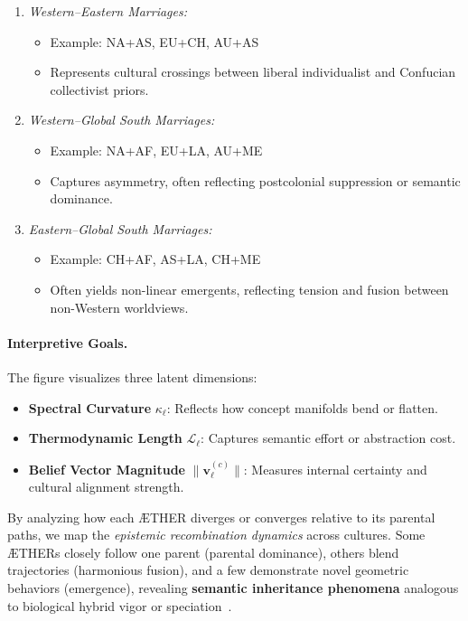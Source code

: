 \begin{enumerate}[leftmargin=1.5em]
    \item \emph{Western--Eastern Marriages:} 
    \begin{itemize}
        \item Example: NA+AS, EU+CH, AU+AS
        \item Represents cultural crossings between liberal individualist and Confucian collectivist priors.
    \end{itemize}
    
    \item \emph{Western--Global South Marriages:}
    \begin{itemize}
        \item Example: NA+AF, EU+LA, AU+ME
        \item Captures asymmetry, often reflecting postcolonial suppression or semantic dominance.
    \end{itemize}
    
    \item \emph{Eastern--Global South Marriages:}
    \begin{itemize}
        \item Example: CH+AF, AS+LA, CH+ME
        \item Often yields non-linear emergents, reflecting tension and fusion between non-Western worldviews.
    \end{itemize}
\end{enumerate}

\paragraph{\textbf{Interpretive Goals.}} The figure visualizes three latent dimensions:
\begin{itemize}[leftmargin=1.5em]
    \item \textbf{Spectral Curvature} \( \kappa_\ell \): Reflects how concept manifolds bend or flatten.
    \item \textbf{Thermodynamic Length} \( \mathcal{L}_\ell \): Captures semantic effort or abstraction cost.
    \item \textbf{Belief Vector Magnitude} \( \| \mathbf{v}_\ell^{(c)} \| \): Measures internal certainty and cultural alignment strength.
\end{itemize}

By analyzing how each ÆTHER diverges or converges relative to its parental paths, we map the \emph{epistemic recombination dynamics} across cultures. Some ÆTHERs closely follow one parent (parental dominance), others blend trajectories (harmonious fusion), and a few demonstrate novel geometric behaviors (emergence), revealing \textbf{semantic inheritance phenomena} analogous to biological hybrid vigor or speciation~\citep{presgraves2010speciation, gavrilets2003models}.

